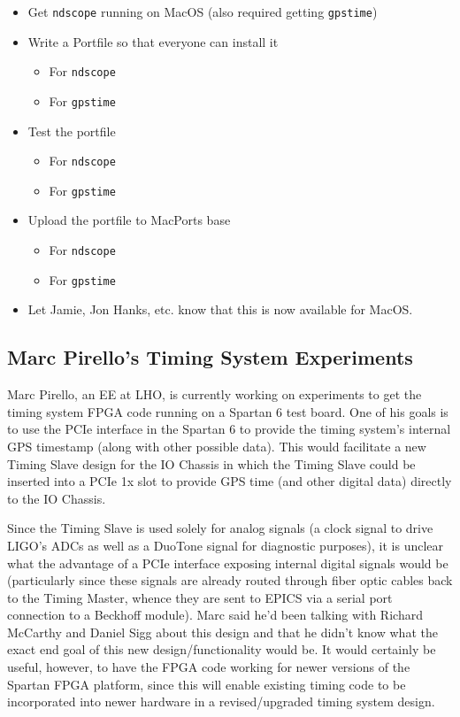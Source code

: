\documentclass{article}
\newcommand*{\TODO}{\textcolor{todo}}
\begin{document}
\begin{itemize}
    \item Get \texttt{ndscope} running on MacOS (also required getting \texttt{gpstime})
    \item \TODO{Write a Portfile so that everyone can install it}
        \begin{itemize}
            \item \TODO{For \texttt{ndscope}}
            \item \TODO{For \texttt{gpstime}}
        \end{itemize}
    \item \TODO{Test the portfile}
        \begin{itemize}
            \item \TODO{For \texttt{ndscope}}
            \item \TODO{For \texttt{gpstime}}
        \end{itemize}
    \item \TODO{Upload the portfile to MacPorts base}
        \begin{itemize}
            \item \TODO{For \texttt{ndscope}}
            \item \TODO{For \texttt{gpstime}}
        \end{itemize}
    \item \TODO{Let Jamie, Jon Hanks, etc. know that this is now available for MacOS.}
\end{itemize}

\subsection{\label{sec:marc-pirello}Marc Pirello's Timing System Experiments}

Marc Pirello, an EE at LHO, is currently working on experiments to get the timing system FPGA code running on a Spartan 6 test board. One of his goals is to use the PCIe interface in the Spartan 6 to provide the timing system's internal GPS timestamp (along with other possible data). This would facilitate a new Timing Slave design for the IO Chassis in which the Timing Slave could be inserted into a PCIe 1x slot to provide GPS time (and other digital data) directly to the IO Chassis.

Since the Timing Slave is used solely for analog signals (a clock signal to drive LIGO's ADCs as well as a DuoTone signal for diagnostic purposes), it is unclear what the advantage of a PCIe interface exposing internal digital signals would be (particularly since these signals are already routed through fiber optic cables back to the Timing Master, whence they are sent to EPICS via a serial port connection to a Beckhoff module). Marc said he'd been talking with Richard McCarthy and Daniel Sigg about this design and that he didn't know what the exact end goal of this new design/functionality would be. It would certainly be useful, however, to have the FPGA code working for newer versions of the Spartan FPGA platform, since this will enable existing timing code to be incorporated into newer hardware in a revised/upgraded timing system design.
\end{document}
